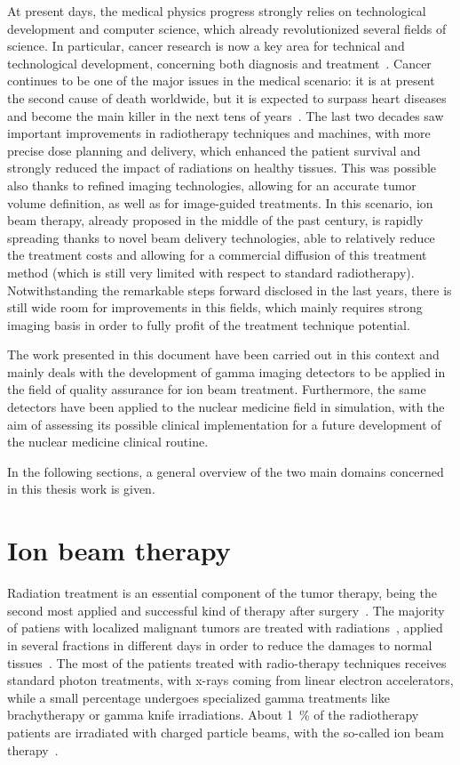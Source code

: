 At present days, the medical physics progress strongly relies on technological development and computer science, which already revolutionized several fields of science. In particular, cancer research is now a key area for technical and technological development, concerning both diagnosis and treatment~\parencite{Webb2009}. Cancer continues to be one of the major issues in the medical scenario: it is at present the second cause of death worldwide, but it is expected to surpass heart diseases and become the main killer in the next tens of years~\parencite{Jemal2010, Thun2010}. The last two decades saw important improvements in radiotherapy techniques and machines, with more precise dose planning and delivery, which enhanced the patient survival and strongly reduced the impact of radiations on healthy tissues. This was possible also thanks to refined imaging technologies, allowing for an accurate tumor volume definition, as well as for image-guided treatments. In this scenario, ion beam therapy, already proposed in the middle of the past century, is rapidly spreading thanks to novel beam delivery technologies, able to relatively reduce the treatment costs and allowing for a commercial diffusion of this treatment method (which is still very limited with respect to standard radiotherapy). Notwithstanding the remarkable steps forward disclosed in the last years, there is still wide room for improvements in this fields, which mainly requires strong imaging basis in order to fully profit of the treatment technique potential.

The work presented in this document have been carried out in this context and mainly deals with the development of gamma imaging detectors to be applied in the field of quality assurance for ion beam treatment. Furthermore, the same detectors have been applied to the nuclear medicine field in simulation, with the aim of assessing its possible clinical implementation for a future development of the nuclear medicine clinical routine. 

In the following sections, a general overview of the two main domains concerned in this thesis work is given. 

\section{Ion beam therapy}\label{chap1::sec::ionBeamTher}
Radiation treatment is an essential component of the tumor therapy, being the second most applied and successful kind of therapy after surgery~\parencite{Schardt2010}. The majority of patiens with localized malignant tumors are treated with radiations~\parencite{Durante2009, Baskar2012, Moding2013}, applied in several fractions in different days in order to reduce the damages to normal tissues~\parencite{Bentzen2006}. The most of the patients treated with radio-therapy techniques receives standard photon treatments, with x-rays coming from linear electron accelerators, while a small percentage undergoes specialized gamma treatments like brachytherapy or gamma knife irradiations. About 1~\% of the radiotherapy patients are irradiated with charged particle beams, with the so-called ion beam therapy~\parencite{Durante2016}.

